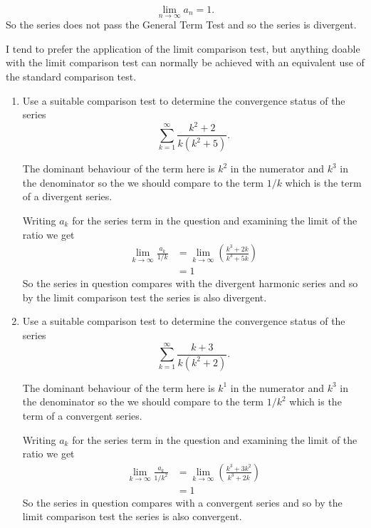 \documentclass[oneside,10pt]{memoir}
\newcounter{pass}
\begin{document}
{\begin{enumerate}
\begin{solution}
$$\lim_{n \to \infty} a_n = 1.$$
So the series does not pass the General Term Test and so the series is divergent.
\end{solution}
\setcounter{pass}{\value{enumi}}
\end{enumerate}
\begin{solution}I tend to prefer the application of the limit comparison test, but anything doable with the limit comparison test can normally be achieved with an equivalent use of the standard comparison test.\end{solution}
\begin{enumerate}
\setcounter{enumi}{\value{pass}}
\item
Use a suitable comparison test to determine the convergence status of the series
$$ \sum_{k=1}^\infty \frac{k^2 + 2}{k(k^2 + 5)}.$$
\begin{solution}The dominant behaviour of the term here is $k^2$ in the numerator and $k^3$ in the denominator so the we should compare to the term $1/k$ which is the term of a divergent series.

Writing $a_k$ for the series term in the question and examining the limit of the ratio we get
\begin{align*}
\lim_{k \to \infty} \frac{a_k}{1/k}
&= \lim_{k \to \infty} \left ( \frac{k^3 + 2k}{k^3 + 5k} \right )\\
&=1
\end{align*}
So the series in question compares with the divergent harmonic series and so by the limit comparison test the series is also divergent.
\end{solution}
\item
Use a suitable comparison test to determine the convergence status of the series
$$ \sum_{k=1}^\infty \frac{k+3}{k(k^2 + 2)}.$$
\begin{solution}The dominant behaviour of the term here is $k^1$ in the numerator and $k^3$ in the denominator so the we should compare to the term $1/k^2$ which is the term of a convergent series.

Writing $a_k$ for the series term in the question and examining the limit of the ratio we get
\begin{align*}
\lim_{k \to \infty} \frac{a_k}{1/k^2}
&= \lim_{k \to \infty} \left ( \frac{k^3 + 3k^2}{k^3 + 2k} \right )\\
&=1
\end{align*}
So the series in question compares with a convergent series and so by the limit comparison test the series is also convergent.
\end{solution}
\setcounter{pass}{\value{enumi}}
\end{enumerate}
\vskip 2pt

}
\end{document}
